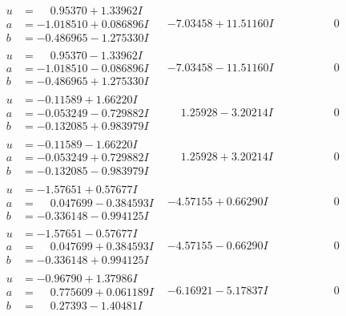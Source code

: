 \documentclass[1p]{elsarticle_modified}
\theoremstyle{definition}
\begin{document}
$$\begin{array}{c|c|c}
\begin{aligned}
u &= \phantom{-}0.95370 + 1.33962 I \\
a &= -1.018510 + 0.086896 I \\
b &= -0.486965 - 1.275330 I\end{aligned}
 & -7.03458 + 11.51160 I & \phantom{-0.000000 } 0 \\ \hline\begin{aligned}
u &= \phantom{-}0.95370 - 1.33962 I \\
a &= -1.018510 - 0.086896 I \\
b &= -0.486965 + 1.275330 I\end{aligned}
 & -7.03458 - 11.51160 I & \phantom{-0.000000 } 0 \\ \hline\begin{aligned}
u &= -0.11589 + 1.66220 I \\
a &= -0.053249 - 0.729882 I \\
b &= -0.132085 + 0.983979 I\end{aligned}
 & \phantom{-}1.25928 - 3.20214 I & \phantom{-0.000000 } 0 \\ \hline\begin{aligned}
u &= -0.11589 - 1.66220 I \\
a &= -0.053249 + 0.729882 I \\
b &= -0.132085 - 0.983979 I\end{aligned}
 & \phantom{-}1.25928 + 3.20214 I & \phantom{-0.000000 } 0 \\ \hline\begin{aligned}
u &= -1.57651 + 0.57677 I \\
a &= \phantom{-}0.047699 - 0.384593 I \\
b &= -0.336148 - 0.994125 I\end{aligned}
 & -4.57155 + 0.66290 I & \phantom{-0.000000 } 0 \\ \hline\begin{aligned}
u &= -1.57651 - 0.57677 I \\
a &= \phantom{-}0.047699 + 0.384593 I \\
b &= -0.336148 + 0.994125 I\end{aligned}
 & -4.57155 - 0.66290 I & \phantom{-0.000000 } 0 \\ \hline\begin{aligned}
u &= -0.96790 + 1.37986 I \\
a &= \phantom{-}0.775609 + 0.061189 I \\
b &= \phantom{-}0.27393 - 1.40481 I\end{aligned}
 & -6.16921 - 5.17837 I & \phantom{-0.000000 } 0 \\ \hline\begin{aligned}

\end{aligned}
\end{array}$$
\end{document}
